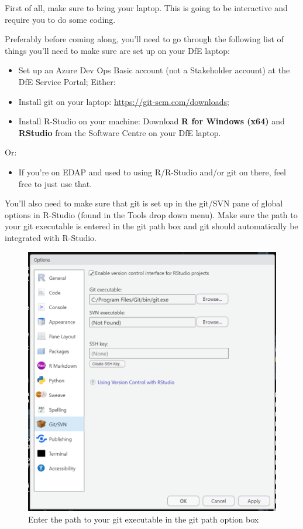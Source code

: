 \documentclass[
  12pt,
]{article}
\providecommand{\tightlist}{%
  \setlength{\itemsep}{0pt}\setlength{\parskip}{0pt}}
\begin{document}
First of all, make sure to bring your laptop. This is going to be
interactive and require you to do some coding.

Preferably before coming along, you'll need to go through the following
list of things you'll need to make sure are set up on your DfE laptop:

\begin{itemize}
\item
  Set up an Azure Dev Ops Basic account (not a Stakeholder account) at
  the DfE Service Portal; Either:
\item
  Install git on your laptop: \url{https://git-scm.com/downloads};
\item
  Install R-Studio on your machine: Download \textbf{R for Windows
  (x64)} and \textbf{RStudio} from the Software Centre on your DfE
  laptop.
\end{itemize}

Or:

\begin{itemize}
\tightlist
\item
  If you're on EDAP and used to using R/R-Studio and/or git on there,
  feel free to just use that.
\end{itemize}

You'll also need to make sure that git is set up in the git/SVN pane of
global options in R-Studio (found in the Tools drop down menu). Make
sure the path to your git executable is entered in the git path box and
git should automatically be integrated with R-Studio.

\begin{figure}
\includegraphics[width=0.64\linewidth]{images/gitdemo/gitdemo-gitRstudio-settings} \caption{Enter the path to your git executable in the git path option box}\label{fig:unnamed-chunk-2}
\end{figure}
\end{document}
